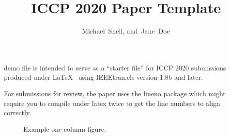 \documentclass[10pt,journal,compsoc]{IEEEtran}
\title{ICCP 2020 Paper Template}
\author{Michael~Shell,
        and~Jane~Doe%
\IEEEcompsocitemizethanks{\IEEEcompsocthanksitem M. Shell is with the Department
of Electrical and Computer Engineering, Georgia Institute of Technology, Atlanta,
GA, 30332.\protect\\
E-mail: see http://www.michaelshell.org/contact.html
\IEEEcompsocthanksitem J. Doe is with Anonymous University.}%
}
\newif\ifpeerreview
\newcommand{\paperID}{XXXX}
\begin{document}


\ifpeerreview
\linenumbers \linenumbersep 15pt\relax 
\author{Paper ID \paperID\IEEEcompsocitemizethanks{\IEEEcompsocthanksitem This paper is under review for ICCP 2020 and the PAMI special issue on computational photography. Do not distribute.}}
\markboth{Anonymous ICCP 2020 submission ID \paperID}%
{}
\fi
\maketitle



% 
% 
% 
% 
 demo file is intended to serve as a ``starter
file'' for ICCP 2020 submissions produced under
\LaTeX~\cite{kopka-latex} using IEEEtran.cls version 1.8b and later.

For submissions for review, the paper uses the lineno package which
might require you to compile under latex twice to get the line numbers
to align correctly.

\lipsum[2-4]


\begin{figure}[!t]
\centering
{}
\caption{Example one-column figure.}
\end{figure}
\end{document}
